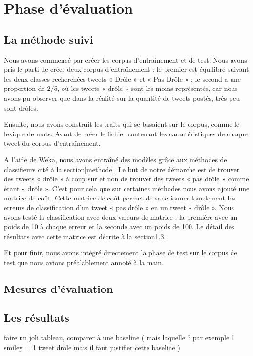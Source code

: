 \documentclass[10pt,a4paper,twoside]{article}
\begin{document}
\section{Phase d'évaluation}
\label{eval}
\subsection{La méthode suivi}
Nous avons commencé par créer les corpus d'entraînement et de test. Nous avons pris le parti de créer deux corpus d'entraînement : le premier est équilibré suivant les deux classes recherchées tweets « Drôle » et « Pas Drôle » ; le second a une proportion de 2/5, où les tweets « drôle » sont les moins représentés, car nous avons pu observer que dans la réalité sur la quantité de tweets postés, très peu sont drôles.

Ensuite, nous avons construit les traits qui se basaient sur le corpus, comme le lexique de mots. Avant de créer le fichier contenant les caractéristiques de chaque tweet du corpus d'entraînement.

A l'aide de Weka, nous avons entraîné des modèles grâce aux méthodes de classifieurs cité à la section\ref{methode}. Le but de notre démarche est de trouver des tweets « drôle » à coup sur et non de trouver des tweets « pas drôle » comme étant « drôle ». C'est pour cela que sur certaines méthodes nous avons ajouté une matrice de coût. Cette matrice de coût permet de sanctionner lourdement les erreurs de classification d'un tweet « pas drôle » en un tweet « drôle ». Nous avons testé la classification avec deux valeurs de matrice : la première avec un poids de 10 à chaque erreur et la seconde avec un poids de 100. Le détail des résultats avec cette matrice est décrite à la section\ref{res}.

Et pour finir, nous avons intégré directement la phase de test sur le corpus de test que nous avions préalablement annoté à la main.

\subsection{Mesures d'évaluation}

\subsection{Les résultats}
\label{res}
faire un joli tableau, comparer à une baseline ( mais laquelle ? par exemple  1 smiley = 1 tweet drole mais il faut justifier cette baseline ) 
\end{document}
